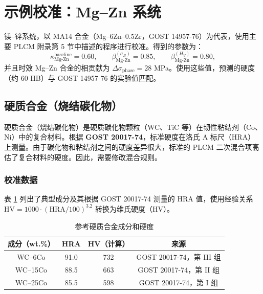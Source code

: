 \documentclass[12pt,a4paper]{article}
\begin{document}
	\section{示例校准：Mg–Zn 系统}
	镁–锌系统，以 MA14 合金（Mg–6Zn–0.5Zr，GOST 14957-76）为代表，使用主要 PLCM 附录第 5 节中描述的程序进行校准。得到的参数为：
	\[
	\kappa_{\text{Mg-Zn}}^{\text{baseline}} = 0.60,\qquad
	\beta_{\text{Mg-Zn}}^{(\sigma_B)} = 0.85,\qquad
	\beta_{\text{Mg-Zn}}^{(H_V)} = 0.80,
	\]
	并且时效 Mg–Zn 合金的相贡献为 $\Delta\sigma_{\text{phase}} = 28$ MPa。使用这些值，预测的硬度（约 60 HB）与 GOST 14957-76 的实验值匹配。
	
	
	\subsection{硬质合金（烧结碳化物）}
	\label{subsec:hardmetals}
	
	硬质合金（烧结碳化物）是硬质碳化物颗粒（WC、TiC 等）在韧性粘结剂（Co、Ni）中的复合材料。根据 \textbf{GOST 20017-74}，标准硬度在洛氏 A 标尺（HRA）上测量。由于碳化物和粘结剂之间的硬度差异很大，标准的 PLCM 二次混合项高估了复合材料的硬度。因此，需要修改混合规则。
	
	\subsubsection{校准数据}
	表 \ref{tab:hardmetal_compositions} 列出了典型成分及其根据 GOST 20017-74 测量的 HRA 值，使用经验关系 $\text{HV} = 1000 \cdot (\text{HRA}/100)^{3.2}$ 转换为维氏硬度（HV）。
	
	\begin{table}[htbp]
		\centering
		\caption{参考硬质合金成分和硬度}
		\label{tab:hardmetal_compositions}
		\begin{tabular}{cccc}
			\toprule
			\textbf{成分（wt.\%）} & \textbf{HRA} & \textbf{HV（计算）} & \textbf{来源} \\
			\midrule
			WC–6Co & 91.0 & 732 & GOST 20017-74，第 III 组 \\
			WC–15Co & 88.5 & 663 & GOST 20017-74，第 II 组 \\
			WC–25Co & 85.5 & 598 & GOST 20017-74，第 I 组 \\
			\bottomrule
		\end{tabular}
	\end{table}
	
\end{document}
